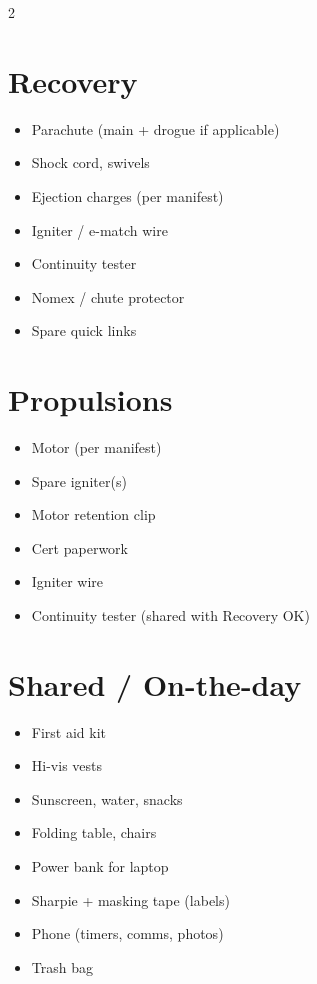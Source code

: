 \documentclass[10pt,a4paper]{article}
\begin{document}
\begin{multicols}{2}
\section*{Recovery}
\begin{itemize}
  \item Parachute (main + drogue if applicable)
  \item Shock cord, swivels
  \item Ejection charges (per manifest)
  \item Igniter / e-match wire
  \item Continuity tester
  \item Nomex / chute protector
  \item Spare quick links
\end{itemize}

\section*{Propulsions}
\begin{itemize}
  \item Motor (per manifest)
  \item Spare igniter(s)
  \item Motor retention clip
  \item Cert paperwork
  \item Igniter wire
  \item Continuity tester (shared with Recovery OK)
\end{itemize}

\section*{Shared / On-the-day}
\begin{itemize}
  \item First aid kit
  \item Hi-vis vests
  \item Sunscreen, water, snacks
  \item Folding table, chairs
  \item Power bank for laptop
  \item Sharpie + masking tape (labels)
  \item Phone (timers, comms, photos)
  \item Trash bag
\end{itemize}


\end{multicols}
\end{document}
